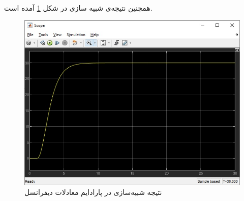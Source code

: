 \documentclass[]{article}
\begin{document}
همچنین نتیجه‌ی شبیه سازی در شکل
\ref{fig:diff:results}
آمده است.
\begin{figure}[H]
    \centering
    \includegraphics[scale=0.8]{pics/diff_result.jpg}
    \caption{نتیجه شبیه‌سازی در پارادایم معادلات دیفرانسل}
    \label{fig:diff:results}
\end{figure}
\end{document}
